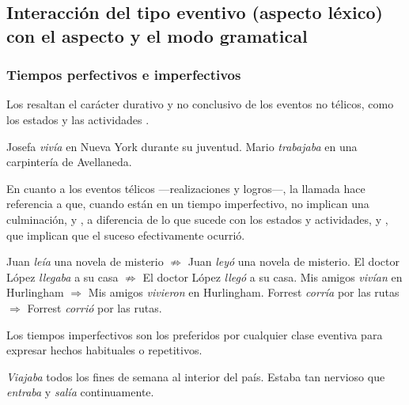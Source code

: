 \subsection{Interacción del tipo eventivo (aspecto léxico) con el aspecto y el modo gramatical}\label{sec:08-interaccion}

\subsubsection{Tiempos perfectivos e imperfectivos}\label{sec:08-perfectivos}

Los  resaltan el carácter durativo y no
conclusivo de los eventos no télicos, como los estados  y
las actividades .

\begin{exe}
  \ex\label{ex:08-josefa} Josefa \textit{vivía} en Nueva York durante su
      juventud.
  \ex\label{ex:08-mario} Mario \textit{trabajaba} en una carpintería de
      Avellaneda.
\end{exe}

En cuanto a los eventos télicos ---realizaciones y logros---, la llamada
 hace referencia a que, cuando están en un tiempo
imperfectivo, no implican una culminación,  y
, a diferencia de lo que sucede con los estados y
actividades,  y , que implican que el
suceso efectivamente ocurrió.

\begin{exe}
  \ex\label{ex:08-leia} Juan \textit{leía} una novela de misterio $\not\Rightarrow$
      Juan \textit{leyó} una novela de misterio.
  \ex\label{ex:08-llegaba} El doctor López \textit{llegaba} a su casa
      $\not\Rightarrow$ El doctor López \textit{llegó} a su casa.
  \ex\label{ex:08-vivian} Mis amigos \textit{vivían} en Hurlingham $\Rightarrow$
      Mis amigos \textit{vivieron} en Hurlingham.
  \ex\label{ex:08-corria} Forrest \textit{corría} por las rutas $\Rightarrow$
      Forrest \textit{corrió} por las rutas.
\end{exe}

Los tiempos imperfectivos son los preferidos por cualquier clase eventiva para
expresar hechos habituales o repetitivos.

\begin{exe}
  \ex \textit{Viajaba} todos los fines de semana al interior del país.
  \ex Estaba tan nervioso que \textit{entraba} y \textit{salía} continuamente.
\end{exe}

